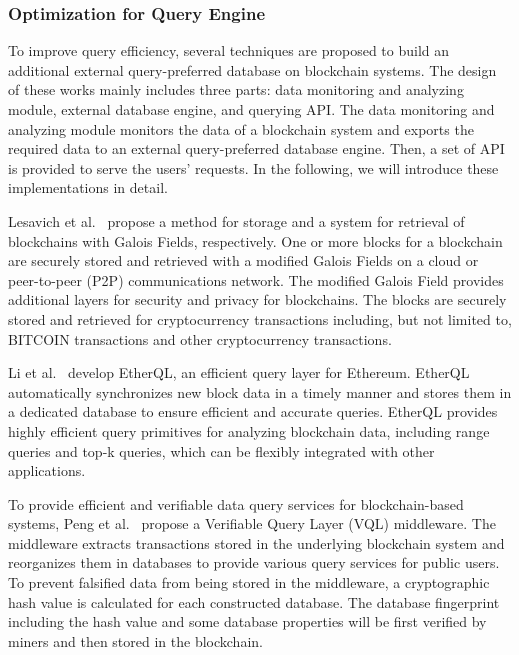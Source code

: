 \documentclass[acmsmall]{acmart}
\begin{document}




\subsubsection{Optimization for Query Engine}


To improve query efficiency, several techniques are proposed to build an additional external query-preferred database on blockchain systems. The design of these works mainly includes three parts: data monitoring and analyzing module, external database engine, and querying API. The data monitoring and analyzing module monitors the data of a blockchain system and exports the required data to an external query-preferred database engine. Then, a set of API is provided to serve the users' requests. In the following, we will introduce these implementations in detail.

Lesavich et al.~\cite{lesavich2017method} propose a method for storage and a system for retrieval of blockchains with Galois Fields, respectively. One or more blocks for a blockchain are securely stored and retrieved with a modified Galois Fields on a cloud or peer-to-peer (P2P) communications network. The modified Galois Field provides additional layers for security and privacy for blockchains. The blocks are securely stored and retrieved for cryptocurrency transactions including, but not limited to, BITCOIN transactions and other cryptocurrency transactions.

Li et al.~\cite{li2017etherql} develop EtherQL, an efficient query layer for Ethereum. EtherQL automatically synchronizes new block data in a timely manner and stores them in a dedicated database to ensure efficient and accurate queries. EtherQL provides highly efficient query primitives for analyzing blockchain data, including range queries and top-k queries, which can be flexibly integrated with other applications.


To provide efficient and verifiable data query services for blockchain-based systems, Peng et al.~\cite{peng2019vql} propose a Verifiable Query Layer (VQL) middleware. The middleware extracts transactions stored in the underlying blockchain system and reorganizes them in databases to provide various query services for public users. To prevent falsified data from being stored in the middleware, a cryptographic hash value is calculated for each constructed database. The database fingerprint including the hash value and some database properties will be first verified by miners and then stored in the blockchain.
\end{document}
